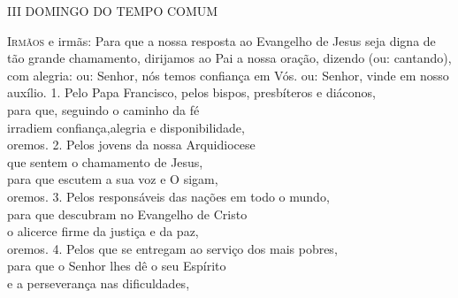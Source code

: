\documentclass{book}
\begin{document}
\pagestyle{empty}
\begin{center}
    \large{III DOMINGO DO TEMPO COMUM}
    \vspace{.2cm} \\
\end{center}
\lettrine[findent=2pt]{\color{VioletRed1}I}{rmãos} e irmãs:
\newline
Para que a nossa resposta ao Evangelho de Jesus
\newline
seja digna de tão grande chamamento,
\newline
dirijamos ao Pai a nossa oração,
\newline
dizendo \textcolor{VioletRed1}{(ou:} cantando\textcolor{VioletRed1}{)}, com alegria:
\vspace{.2cm}
\newline
{}
\newline
\textcolor{VioletRed1}{ou:} Senhor, nós temos confiança em Vós.
\newline
\textcolor{VioletRed1}{ou:} Senhor, vinde em nosso auxílio.
\vspace{.2cm}
\newline
{\color{VioletRed1} 1.} Pelo Papa Francisco, pelos bispos, presbíteros e diáconos,\\
para que, seguindo o caminho da fé\\
irradiem confiança,alegria e disponibilidade,\\
oremos.
\vspace{.1cm}
\newline
{\color{VioletRed1} 2.} Pelos jovens da nossa Arquidiocese\\
que sentem o chamamento de Jesus,\\
para que escutem a sua voz e O sigam,\\
oremos.
\vspace{.1cm}
\newline
{\color{VioletRed1} 3.} Pelos responsáveis das nações em todo o mundo,\\
para que descubram no Evangelho de Cristo\\
o alicerce firme da justiça e da paz,\\
oremos.
\vspace{.1cm}
\newline
{\color{VioletRed1} 4.} Pelos que se entregam ao serviço dos mais pobres,\\
para que o Senhor lhes dê o seu Espírito\\
e a perseverança nas dificuldades,\\
\end{document}

